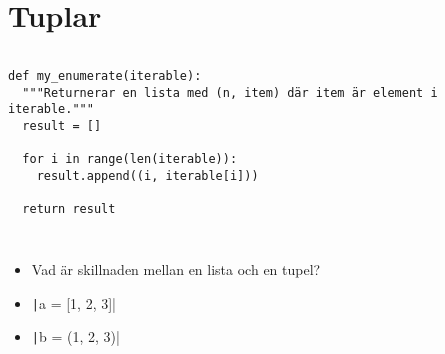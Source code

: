 \mode*

\section{Tuplar}

\begin{frame}[fragile]
  \begin{example}[tuples.py]
    \inputminted{python}{examples/tuples.py}
  \end{example}

  \pause

  \begin{example}
    \begin{verbatim}
def my_enumerate(iterable):
  """Returnerar en lista med (n, item) där item är element i iterable."""
  result = []

  for i in range(len(iterable)):
    result.append((i, iterable[i]))

  return result
    \end{verbatim}
  \end{example}
\end{frame}

\begin{frame}[fragile]
  \begin{example}[fullname.py]
    \inputminted[firstline=3,lastline=7]{python}{examples/fullname.py}
  \end{example}

  \pause

  \begin{example}
    \inputminted[firstline=3,lastline=7,highlightlines=7]{python}{examples/fullname-alt.py}
  \end{example}
\end{frame}

\begin{frame}[fragile]
  \begin{exercise}
    \begin{itemize}
      \item Vad är skillnaden mellan en lista och en tupel?
      \item \texttt|a = [1, 2, 3]|
      \item \texttt|b = (1, 2, 3)|
    \end{itemize}
  \end{exercise}
\end{frame}

